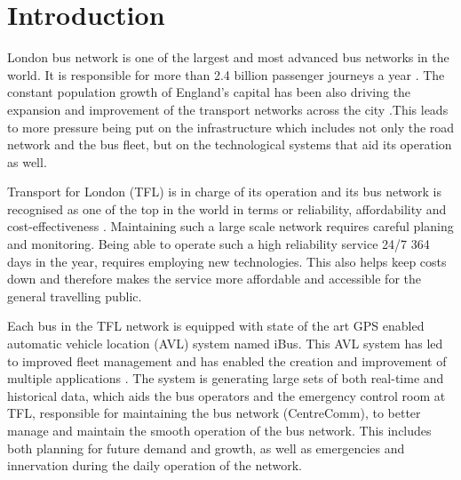 \chapter{Introduction}
London bus network is one of the largest and most advanced bus networks in the world. It is responsible for more than 2.4 billion passenger journeys a year \cite{TFL1}. The constant population growth of England's capital has been also driving the expansion and improvement of the transport networks across the city \cite{TFL2}.This leads to more pressure being put on the infrastructure which includes not only the road network and the bus fleet, but on the technological systems that aid its operation as well.

Transport for London (TFL) is in charge of its operation and its bus network is recognised as one of the top in the world in terms or reliability, affordability and cost-effectiveness \cite{TFL1}. Maintaining such a large scale network requires careful planing and monitoring. Being able to operate such a high reliability service 24/7 364 days in the year, requires employing new technologies. This also helps keep costs down and therefore makes the service more affordable and accessible for the general travelling public. 

Each bus in the TFL network is equipped with state of the art GPS enabled automatic vehicle location (AVL) system named iBus\cite{ibusdeployment}. This AVL system has led to improved fleet management and has enabled the creation and improvement of multiple applications \cite{eps354267}. The system is generating large sets of both real-time and historical data, which aids the bus operators and the emergency control room at TFL, responsible for maintaining the bus network (CentreComm), to better manage and maintain the smooth operation of the bus network. This includes both planning for future demand and growth, as well as emergencies and innervation during the daily operation of the network. 

